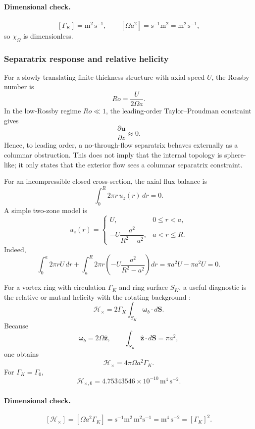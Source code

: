 \paragraph{Dimensional check.}
\[
[\Gamma_K]=\mathrm{m^2\,s^{-1}},
\qquad
[\Omega a^2]=\mathrm{s^{-1}m^2}=\mathrm{m^2\,s^{-1}},
\]
so \(\chi_\Omega\) is dimensionless.

\subsubsection{Separatrix response and relative helicity}

For a slowly translating finite-thickness structure with axial speed \(U\), the
Rossby number is
\[
Ro=\frac{U}{2\Omega a}.
\]
In the low-Rossby regime \(Ro\ll1\), the leading-order Taylor--Proudman
constraint gives
\[
\frac{\partial\mathbf u}{\partial z}\approx0.
\]
Hence, to leading order, a no-through-flow separatrix behaves externally as a
columnar obstruction.  This does not imply that the internal topology is
sphere-like; it only states that the exterior flow sees a columnar separatrix
constraint.

For an incompressible closed cross-section, the axial flux balance is
\[
\boxed{
\int_0^R2\pi r\,u_z(r)\,dr=0.
}
\]
A simple two-zone model is
\[
u_z(r)=
\begin{cases}
U, & 0\le r<a,\\[1mm]
-U\dfrac{a^2}{R^2-a^2}, & a<r\le R.
\end{cases}
\]
Indeed,
\[
\int_0^a2\pi rU\,dr
+
\int_a^R2\pi r\left(-U\frac{a^2}{R^2-a^2}\right)dr
=\pi a^2U-\pi a^2U=0.
\]

For a vortex ring with circulation \(\Gamma_K\) and ring surface \(S_K\), a
useful diagnostic is the relative or mutual helicity with the rotating
background \cite{Moffatt1969}:
\[
\boxed{
\mathcal H_{\times}
=2\Gamma_K\int_{S_K}\boldsymbol\omega_b\cdot d\mathbf S.
}
\]
Because
\[
\boldsymbol\omega_b=2\Omega\hat{\mathbf z},
\qquad
\int_{S_K}\hat{\mathbf z}\cdot d\mathbf S=\pi a^2,
\]
one obtains
\[
\boxed{
\mathcal H_{\times}=4\pi\Omega a^2\Gamma_K.
}
\]
For \(\Gamma_K=\Gamma_0\),
\[
\boxed{
\mathcal H_{\times,0}
=4.75343546\times10^{-10}\,\mathrm{m^4\,s^{-2}}.
}
\]

\paragraph{Dimensional check.}
\[
[\mathcal H_{\times}]
=[\Omega a^2\Gamma_K]
=\mathrm{s^{-1}m^2\,m^2s^{-1}}
=\mathrm{m^4\,s^{-2}}
=[\Gamma_K]^2.
\]

